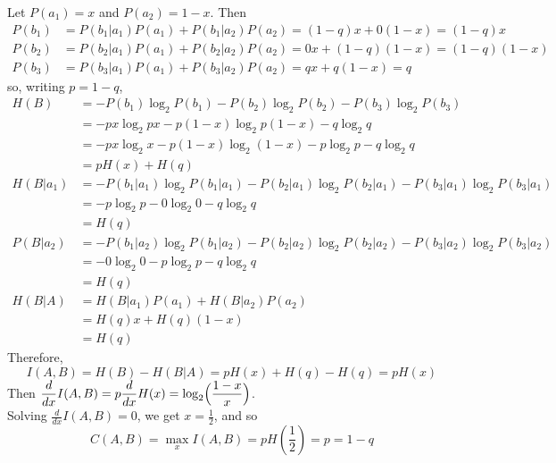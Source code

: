 \documentclass[11pt]{article}
\newcommand{\ds}{\displaystyle}
\begin{document}
\bigskip{}
Let $P(a_1) = x$ and $P(a_2) = 1 - x$.
Then
\begin{align*}
   P(b_1) &= P(b_1|a_1)P(a_1) + P(b_1|a_2)P(a_2)
           = (1-q)x + 0(1-x)
           = (1-q)x\\
   P(b_2) &= P(b_2|a_1)P(a_1)+P(b_2|a_2)P(a_2)
           = 0x + (1-q)(1-x)
           = (1-q)(1-x)\\
   P(b_3) &= P(b_3|a_1)P(a_1)+P(b_3|a_2)P(a_2)
           = qx + q(1-x)
           = q
\end{align*}
    so, writing $p = 1 - q$,
\begin{align*}
   H(B)   &= -P(b_1)\log_2 P(b_1)
             -P(b_2)\log_2 P(b_2)
             -P(b_3)\log_2 P(b_3)\\
          &= -px\log_2 px
             -p(1-x)\log_2 p(1-x)
             -q\log_2 q\\
          &= - px\log_2 x
             - p(1-x)\log_2 (1-x)
             - p\log_2 p
             - q\log_2 q\\
          &= pH(x) + H(q)\\[2mm]
   H(B|a_1)&= -P(b_1|a_1)\log_2 P(b_1|a_1)
              -P(b_2|a_1)\log_2 P(b_2|a_1)
              -P(b_3|a_1)\log_2 P(b_3|a_1)\\
           &= -p\log_2 p
              -0\log_2 0
              -q\log_2 q\\
           &= H(q)\\[2mm]
   P(B|a_2)&= -P(b_1|a_2)\log_2 P(b_1|a_2)
              -P(b_2|a_2)\log_2 P(b_2|a_2)
              -P(b_3|a_2)\log_2 P(b_3|a_2)\\
           &= -0\log_2 0
              -p\log_2 p
              -q\log_2 q\\
           &= H(q)\\
   H(B|A)  &=  H(B|a_1)P(a_1)
              +H(B|a_2)P(a_2)\\
           &= H(q)x + H(q)(1-x)\\
           &= H(q)
\end{align*}
Therefore,
\[
  I(A,B) = H(B) - H(B|A)
         = pH(x) + H(q) - H(q)
         = pH(x)
\]
Then $\ds\frac{d}{dx}I(A,B) = p\frac{d}{dx}H(x) = \log_2\Bigl(\frac{1-x}{x}\Bigr)$.\\
Solving $\ds\frac{d}{dx}I(A,B) = 0$, we get $x = \frac{1}{2}$, and so
\[
  C(A,B) = \max_x I(A,B) = pH(\frac{1}{2}) = p = 1 - q
\]
\end{document}
